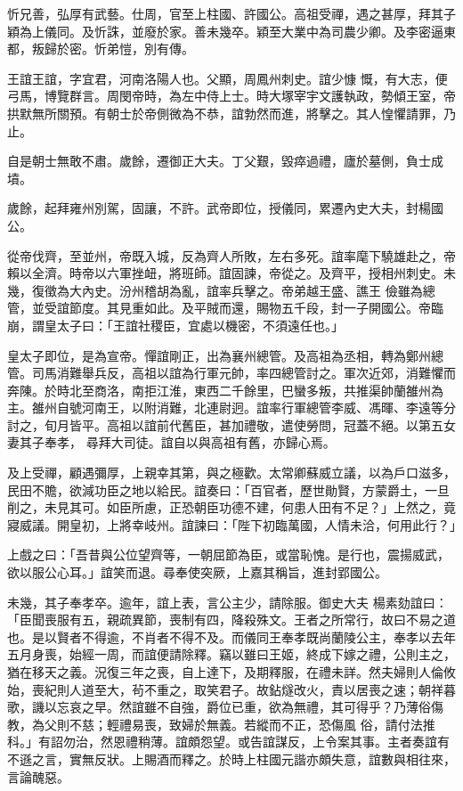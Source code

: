 \begin{pinyinscope}
 忻兄善，弘厚有武藝。仕周，官至上柱國、許國公。高祖受禪，遇之甚厚，拜其子穎為上儀同。及忻誅，並廢於家。善未幾卒。穎至大業中為司農少卿。及李密逼東都，叛歸於密。忻弟愷，別有傳。



 王誼王誼，字宜君，河南洛陽人也。父顯，周鳳州刺史。誼少慷
 慨，有大志，便弓馬，博覽群言。周閔帝時，為左中侍上士。時大塚宰宇文護執政，勢傾王室，帝拱默無所關預。有朝士於帝側微為不恭，誼勃然而進，將擊之。其人惶懼請罪，乃止。



 自是朝士無敢不肅。歲餘，遷御正大夫。丁父艱，毀瘁過禮，廬於墓側，負士成墳。



 歲餘，起拜雍州別駕，固讓，不許。武帝即位，授儀同，累遷內史大夫，封楊國公。



 從帝伐齊，至並州，帝既入城，反為齊人所敗，左右多死。誼率麾下驍雄赴之，帝賴以全濟。時帝以六軍挫衄，將班師。誼固諫，帝從之。及齊平，授相州刺史。未幾，復徵為大內史。汾州稽胡為亂，誼率兵擊之。帝弟越王盛、譙王
 儉雖為總管，並受誼節度。其見重如此。及平賊而還，賜物五千段，封一子開國公。帝臨崩，謂皇太子曰：「王誼社稷臣，宜處以機密，不須遠任也。」



 皇太子即位，是為宣帝。憚誼剛正，出為襄州總管。及高祖為丞相，轉為鄭州總管。司馬消難舉兵反，高祖以誼為行軍元帥，率四總管討之。軍次近郊，消難懼而奔陳。於時北至商洛，南拒江淮，東西二千餘里，巴蠻多叛，共推渠帥蘭雒州為主。雒州自號河南王，以附消難，北連尉迥。誼率行軍總管李威、馮暉、李遠等分討之，旬月皆平。高祖以誼前代舊臣，甚加禮敬，遣使勞問，冠蓋不絕。以第五女妻其子奉孝，
 尋拜大司徒。誼自以與高祖有舊，亦歸心焉。



 及上受禪，顧遇彌厚，上親幸其第，與之極歡。太常卿蘇威立議，以為戶口滋多，民田不贍，欲減功臣之地以給民。誼奏曰：「百官者，歷世勛賢，方蒙爵土，一旦削之，未見其可。如臣所慮，正恐朝臣功德不建，何患人田有不足？」上然之，竟寢威議。開皇初，上將幸岐州。誼諫曰：「陛下初臨萬國，人情未洽，何用此行？」



 上戲之曰：「吾昔與公位望齊等，一朝屈節為臣，或當恥愧。是行也，震揚威武，欲以服公心耳。」誼笑而退。尋奉使突厥，上嘉其稱旨，進封郢國公。



 未幾，其子奉孝卒。逾年，誼上表，言公主少，請除服。御史大夫
 楊素劾誼曰：「臣聞喪服有五，親疏異節，喪制有四，降殺殊文。王者之所常行，故曰不易之道也。是以賢者不得逾，不肖者不得不及。而儀同王奉孝既尚蘭陵公主，奉孝以去年五月身喪，始經一周，而誼便請除釋。竊以雖曰王姬，終成下嫁之禮，公則主之，猶在移天之義。況復三年之喪，自上達下，及期釋服，在禮未詳。然夫婦則人倫攸始，喪紀則人道至大，茍不重之，取笑君子。故鉆燧改火，責以居喪之速；朝祥暮歌，譏以忘哀之早。然誼雖不自強，爵位已重，欲為無禮，其可得乎？乃薄俗傷教，為父則不慈；輕禮易喪，致婦於無義。若縱而不正，恐傷風
 俗，請付法推科。」有詔勿治，然恩禮稍薄。誼頗怨望。或告誼謀反，上令案其事。主者奏誼有不遜之言，實無反狀。上賜酒而釋之。於時上柱國元諧亦頗失意，誼數與相往來，言論醜惡。




\end{pinyinscope}
